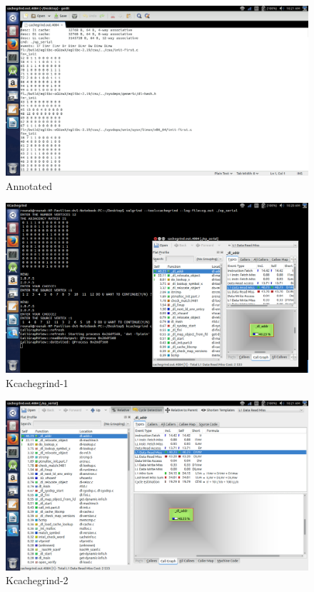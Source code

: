 \documentclass[11pt]{article}%
\begin{document}
\begin{figure}[h!]
\center
\includegraphics[width = 16cm]{project_4}
\caption{Annotated}
\end{figure}

\begin{figure}[h!]
\center
\includegraphics[width = 16cm]{project_3}
\caption{Kcachegrind-1}
\end{figure}

\begin{figure}[h!]
\center
\includegraphics[width = 16cm]{project_5}
\caption{Kcachegrind-2}
\end{figure}
\end{document}
